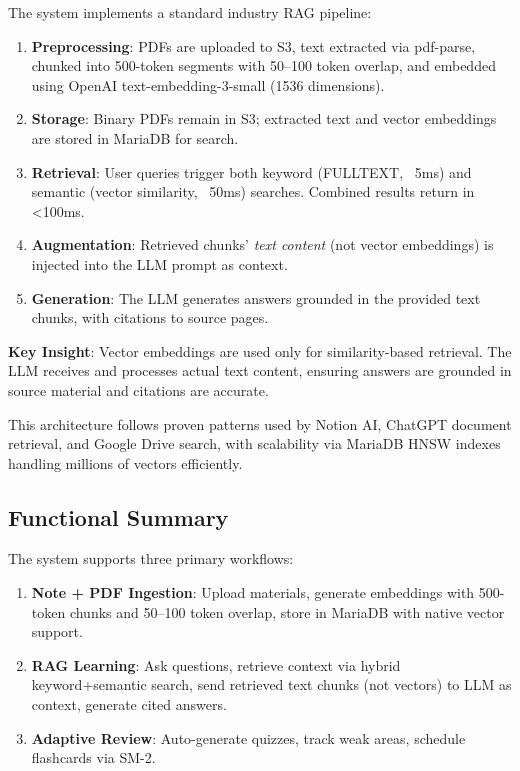 \documentclass[12pt,a4paper]{article}
\begin{document}
The system implements a standard industry RAG pipeline:

\begin{enumerate}
    \item \textbf{Preprocessing}: PDFs are uploaded to S3, text extracted via pdf-parse, chunked into 500-token segments with 50--100 token overlap, and embedded using OpenAI text-embedding-3-small (1536 dimensions).
    \item \textbf{Storage}: Binary PDFs remain in S3; extracted text and vector embeddings are stored in MariaDB for search.
    \item \textbf{Retrieval}: User queries trigger both keyword (FULLTEXT, ~5ms) and semantic (vector similarity, ~50ms) searches. Combined results return in <100ms.
    \item \textbf{Augmentation}: Retrieved chunks' \textit{text content} (not vector embeddings) is injected into the LLM prompt as context.
    \item \textbf{Generation}: The LLM generates answers grounded in the provided text chunks, with citations to source pages.
\end{enumerate}

\textbf{Key Insight}: Vector embeddings are used only for similarity-based retrieval. The LLM receives and processes actual text content, ensuring answers are grounded in source material and citations are accurate.

This architecture follows proven patterns used by Notion AI, ChatGPT document retrieval, and Google Drive search, with scalability via MariaDB HNSW indexes handling millions of vectors efficiently.

\subsection{Functional Summary}

The system supports three primary workflows:

\begin{enumerate}
    \item \textbf{Note + PDF Ingestion}: Upload materials, generate embeddings with 500-token chunks and 50--100 token overlap, store in MariaDB with native vector support.
    \item \textbf{RAG Learning}: Ask questions, retrieve context via hybrid keyword+semantic search, send retrieved text chunks (not vectors) to LLM as context, generate cited answers.
    \item \textbf{Adaptive Review}: Auto-generate quizzes, track weak areas, schedule flashcards via SM-2.
\end{enumerate}
\end{document}
